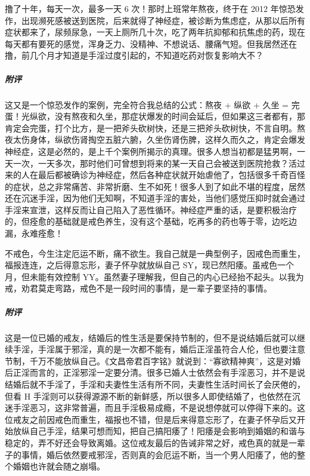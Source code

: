 \begin{case}
    撸了十年，每天一次，最多一天 6 次！那时上班常年熬夜，终于在 2012 年惊恐发作，出现濒死感被送到医院，后来就得了神经症，被诊断为焦虑症，从那以后所有症状都来了，尿频尿急，一天上厕所几十次，吃了两年抗抑郁和抗焦虑的药，现在每天都有要死的感觉，浑身乏力、没精神、不想说话、腰痛气短。但我居然还在撸，前几个月才知道是手淫过度引起的，不知道吃药对恢复影响大不？
    \subparagraph{附评} 这又是一个惊恐发作的案例，完全符合我总结的公式：熬夜 + 纵欲 + 久坐 = 完蛋！光纵欲，没有熬夜和久坐，那症状爆发的时间会延后，但如果这三者都有，那肯定会完蛋，打个比方，是一把斧头砍树快，还是三把斧头砍树快，不言自明。熬夜太伤身体，纵欲伤肾掏空五脏六腑，久坐伤肾伤脾，这样久而久之，肯定会爆发神经症，这是必然的，是上千个案例所揭示的真理。很多人想当初都是猛男啊，一天一次，一天多次，那时他们可曾想到将来的某一天自己会被送到医院抢救？活过来的人在最后都被确诊为神经症，然后各种症状就开始虐他了，包括很多千奇百怪的症状，总之非常痛苦、非常折磨、生不如死！很多人到了如此不堪的程度，居然还在沉迷手淫，因为他们无知啊，不知道手淫的害处，当他们感觉压抑时就会通过手淫来宣泄，这样反而让自己陷入了恶性循环。神经症严重的话，是要积极治疗的，但痊愈的基础就是戒色养生，没有这个基础，吃再多的药也等于零，边吃边漏，永难痊愈！
\end{case}

\begin{case}
    不戒色，今生注定厄运不断，痛不欲生。我自己就是一典型例子，因戒色而重生，福报连连，之后得意忘形，妻子怀孕就放纵自己 SY，现已然阳痿。虽戒色一个月，但未能有效控制 YY。虽然妻子理解我，但自己的内心已经抬不起头。以我为戒，劝君莫走弯路，戒色不是一段时间的事情，是一辈子要坚持的事情。
    \subparagraph{附评} 这是一位已婚的戒友，结婚后的性生活是要保持节制的，但不是说结婚后就可以继续手淫，手淫属于邪淫，真的是一次都不能有，婚后正淫虽符合人伦，但也要注意节制，千万不能放纵自己。《文昌帝君百字铭》就说到：“寡欲精神爽”，这是对婚后正淫而言的，正淫邪淫一定要分清。很多已婚人士依然会有手淫恶习，并不是说结婚后就不手淫了，手淫和夫妻性生活有所不同，夫妻性生活时间长了会厌倦的，但看 H 手淫则可以获得源源不断的新鲜感，所以很多人即使结婚了，也依然在沉迷手淫恶习，这非常普遍，而且手淫极易成瘾，不是说想停就可以停得下来的。这位戒友之前因戒色而重生，福报也不错，但是后来得意忘形了，在妻子怀孕后又开始放纵自己手淫，结果可想而知，把自己搞阳痿了！阳痿是会影响到婚姻的和谐与稳定的，弄不好还会导致离婚。这位戒友最后的告诫非常之好，戒色真的就是一辈子的事情，婚后依然要戒邪淫，否则真的会厄运不断，当一个男人阳痿了，他的整个婚姻也许就会随之崩塌。
\end{case}

